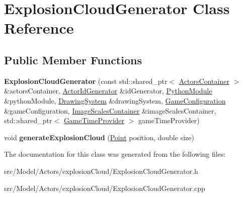 \hypertarget{classExplosionCloudGenerator}{}\section{Explosion\+Cloud\+Generator Class Reference}
\label{classExplosionCloudGenerator}
\subsection*{Public Member Functions}
\begin{DoxyCompactItemize}
\item 
{\bfseries Explosion\+Cloud\+Generator} (const std\+::shared\+\_\+ptr$<$ \hyperlink{classActorsContainer}{Actors\+Container} $>$ \&actors\+Container, \hyperlink{classActorIdGenerator}{Actor\+Id\+Generator} \&id\+Generator, \hyperlink{classPythonModule}{Python\+Module} \&python\+Module, \hyperlink{classDrawingSystem}{Drawing\+System} \&drawing\+System, \hyperlink{classGameConfiguration}{Game\+Configuration} \&game\+Configuration, \hyperlink{classImageScalesContainer}{Image\+Scales\+Container} \&image\+Scales\+Container, std\+::shared\+\_\+ptr$<$ \hyperlink{classGameTimeProvider}{Game\+Time\+Provider} $>$ game\+Time\+Provider)\hypertarget{classExplosionCloudGenerator_a268fca335920de52fff313734407f396}{}\label{classExplosionCloudGenerator_a268fca335920de52fff313734407f396}

\item 
void {\bfseries generate\+Explosion\+Cloud} (\hyperlink{classPoint}{Point} position, double size)\hypertarget{classExplosionCloudGenerator_aa4e9aa7c9543858cbd97b1a15713b3d3}{}\label{classExplosionCloudGenerator_aa4e9aa7c9543858cbd97b1a15713b3d3}

\end{DoxyCompactItemize}


The documentation for this class was generated from the following files\+:\begin{DoxyCompactItemize}
\item 
src/\+Model/\+Actors/explosion\+Cloud/Explosion\+Cloud\+Generator.\+h\item 
src/\+Model/\+Actors/explosion\+Cloud/Explosion\+Cloud\+Generator.\+cpp\end{DoxyCompactItemize}
